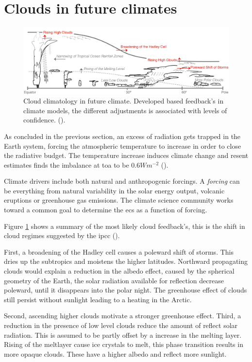 \section{Clouds in future climates} \label{sec:intro_cloud_future_climates}
\begin{figure}[h]
    \centering
    \includegraphics[scale = 0.8]{Chapter1_Intro/images/Fig7-11_ipcc.jpg}
    \caption{Cloud climatology in future climate. Developed based feedback's in climate models, the different adjustments is associated with levels of confidence.  (\cite{IPCC_CH7_clouds}).}
    \label{fig:cloud_scheme}
\end{figure}
As concluded in the previous section, an excess of radiation gets trapped in the Earth system, forcing the atmospheric temperature to increase in order to close the radiative budget. The temperature increase induces climate change and resent estimates finds the imbalance at \acrshort{toa} to be $0.6 Wm^{-2}$ (\cite{Wild2019TheModels}).

Climate drivers include both natural and anthropogenic forcings. A \textit{forcing} can be everything from natural variability in the solar energy output, volcanic eruptions or greenhouse gas emissions. The climate science community works toward a common goal to determine the \acrshort{ecs} as a function of forcing. %

Figure \ref{fig:cloud_scheme} shows a summary of the most likely cloud feedback's, this is the shift in cloud regimes suggested by the \acrshort{ipcc} (\cite{IPCC_CH7_clouds}).

First, a broadening of the Hadley cell causes a poleward shift of storms. This dries up the subtropics and moistens the higher latitudes. Northward propagating clouds would explain a reduction in the albedo effect, caused by the spherical geometry of the Earth, the solar radiation available for reflection decrease poleward, until it disappears into the polar night. 
The greenhouse effect of clouds still persist without sunlight leading to a heating in the Arctic.

Second, ascending higher clouds motivate a stronger greenhouse effect. Third, a reduction in the presence of low level clouds reduce the amount of reflect solar radiation. This is assumed to be partly offset by a increase in the melting layer. Rising of the meltlayer cause ice crystals to melt, this phase transition results in more opaque clouds. These have a higher albedo and reflect more sunlight. 